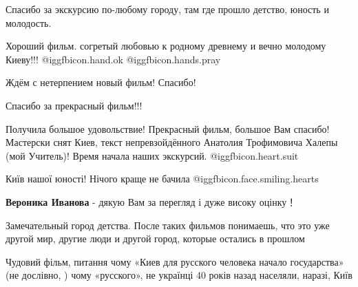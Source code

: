 \begin{itemize}
Спасибо за экскурсию по-любому городу, там где прошло детство, юность и молодость.

Хороший фильм. согретый любовью к родному древнему и вечно молодому Киеву!!! @igg{fbicon.hand.ok}  @igg{fbicon.hands.pray} 

Ждём с нетерпением новый фильм! Спасибо!

Спасибо за прекрасный фильм!!!


Получила большое удовольствие! Прекрасный фильм, большое Вам спасибо! Мастерски
снят Киев, текст непревзойдённого Анатолия Трофимовича Халепы (мой Учитель)!
Время начала наших экскурсий. @igg{fbicon.heart.suit}

Київ нашої юності! Нічого краще не бачила  @igg{fbicon.face.smiling.hearts} 

\textbf{Вероника Иванова} - дякую Вам за перегляд і дуже високу оцінку！


Замечательный город детства. После таких фильмов понимаешь, что это уже другой
мир, другие люди и другой город, которые остались в прошлом


Чудовий фільм, питання чому «Киев для русского человека начало государства» (не
дослівно, ) чому «русского», не українці 40 років назад населяли, наразі, Київ

\end{itemize} %
